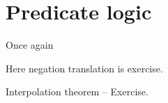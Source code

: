 %
\chapter{Predicate logic}
%
Once again

Here negation translation is exercise.

Interpolation theorem -- Exercise.